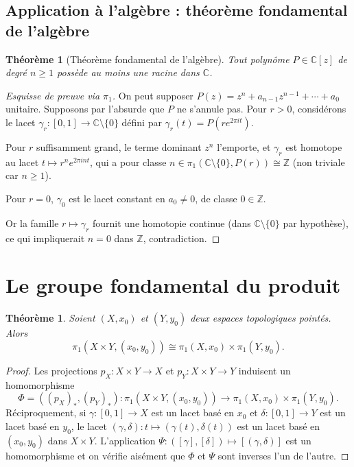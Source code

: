 \documentclass[12pt,a4paper,openany]{book}
\theoremstyle{definition}
\theoremstyle{plain}
\newtheorem{theoreme}[definition]{Théorème}
\theoremstyle{remark}
\newcommand{\Z}{\mathbb{Z}}
\newcommand{\C}{\mathbb{C}}
\begin{document}
\subsection{Application à l'algèbre : théorème fondamental de l'algèbre}\label{subsec:TFA}

\begin{theoreme}[Théorème fondamental de l'algèbre]\label{thm:TFA}
Tout polynôme $P \in \C[z]$ de degré $n \geqslant 1$ possède au moins une
racine dans $\C$.
\end{theoreme}

\begin{proof}[Esquisse de preuve via $\pi_1$]
On peut supposer $P(z) = z^n + a_{n-1}z^{n-1} + \cdots + a_0$ unitaire.
Supposons par l'absurde que $P$ ne s'annule pas. Pour $r > 0$, considérons le
lacet $\gamma_r : [0,1] \to \C \setminus \{0\}$ défini par
$\gamma_r(t) = P(re^{2\pi it})$.

Pour $r$ suffisamment grand, le terme dominant $z^n$ l'emporte, et $\gamma_r$
est homotope au lacet $t \mapsto r^n e^{2\pi i n t}$, qui a pour classe
$n \in \pi_1(\C \setminus \{0\}, P(r)) \cong \Z$ (non triviale car $n \geqslant 1$).

Pour $r = 0$, $\gamma_0$ est le lacet constant en $a_0 \neq 0$, de classe
$0 \in \Z$.

Or la famille $r \mapsto \gamma_r$ fournit une homotopie continue (dans
$\C \setminus \{0\}$ par hypothèse), ce qui impliquerait $n = 0$ dans $\Z$,
contradiction.
\end{proof}

\section{Le groupe fondamental du produit}\label{sec:pi1-produit}

\begin{theoreme}\label{thm:pi1-produit}
Soient $(X, x_0)$ et $(Y, y_0)$ deux espaces topologiques pointés. Alors
\[
\pi_1(X \times Y, (x_0, y_0)) \cong \pi_1(X, x_0) \times \pi_1(Y, y_0).
\]
\end{theoreme}

\begin{proof}
Les projections $p_X : X \times Y \to X$ et $p_Y : X \times Y \to Y$ induisent
un homomorphisme
\[
\Phi = ((p_X)_*, (p_Y)_*) : \pi_1(X \times Y, (x_0, y_0)) \longrightarrow \pi_1(X, x_0) \times \pi_1(Y, y_0).
\]
Réciproquement, si $\gamma : [0,1] \to X$ est un lacet basé en $x_0$ et
$\delta : [0,1] \to Y$ est un lacet basé en $y_0$, le lacet
$(\gamma, \delta) : t \mapsto (\gamma(t), \delta(t))$ est un lacet basé en
$(x_0, y_0)$ dans $X \times Y$. L'application $\Psi : ([\gamma], [\delta]) \mapsto [(\gamma, \delta)]$ est un homomorphisme et on vérifie aisément que $\Phi$ et $\Psi$ sont inverses l'un de l'autre.
\end{proof}
\end{document}
